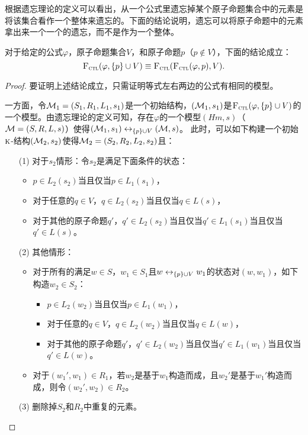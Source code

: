 根据遗忘理论的定义可以看出，从一个公式里遗忘掉某个原子命题集合中的元素是将该集合看作一个整体来遗忘的。下面的结论说明，遗忘可以将原子命题中的元素拿出来一个一个的遗忘，而不是作为一个整体。
\begin{proposition}[Modularity]\label{disTF}
	对于给定的公式$\varphi$，原子命题集合$V$，和原子命题$p$（$p\not \in V$），下面的结论成立：
	\[
	{\textsc{F}_{\textsc{ctl}}}(\varphi,\{p\}\cup V) \equiv {\textsc{F}_{\textsc{ctl}}}({\textsc{F}_{\textsc{ctl}}}(\varphi,p),V).
	\]
\end{proposition}
\begin{proof}
	要证明上述结论成立，只需证明等式左右两边的公式有相同的模型。
	
	一方面，令${\cal M}_1=(S_1,R_1,L_1,s_1)$是一个初始结构，$({\cal M}_1,s_1)$是${\textsc{F}_{\textsc{ctl}}}(\varphi,\{p\}\cup V)$的一个模型。由遗忘理论的定义可知，存在$\varphi$的一个模型$(
	Hm,s)$（${\cal M}=(S,R,L,s)$）使得$({\cal M}_1,s_1)\leftrightarrow_{\{p\}\cup V} ({\cal M},s)$。
	此时，可以如下构建一个初始$\textsc{k}$-结构$({\cal M}_2,s_2)$使得${\cal M}_2=(S_2,R_2,L_2,s_2)$且：
	\begin{itemize}
		\item[(1)] 对于$s_2$情形：令$s_2$是满足下面条件的状态：
		\begin{itemize}
			\item $p \in L_2(s_2)$当且仅当$p\in L_1(s_1)$，
			\item 对于任意的$q \in V$，$q \in L_2(s_2)$当且仅当$q\in L(s)$，
			\item 对于其他的原子命题$q'$，$q' \in L_2(s_2)$当且仅当$q'\in L_1(s_1)$当且仅当$q'\in L(s)$。
		\end{itemize}
			
		\item[(2)] 其他情形：
		\begin{itemize}
			\item 对于所有的满足$w\in S$，$w_1\in S_1$且$w\leftrightarrow_{\{p\}\cup V} w_1$的状态对$(w,w_1)$，如下构造$w_2\in S_2$：
				\begin{itemize}
					\item $p \in L_2(w_2)$当且仅当$p\in L_1(w_1)$，
					\item 对于任意的$q \in V$，$q \in L_2(w_2)$当且仅当$q\in L(w)$，
					\item 对于其他的原子命题$q'$，$q' \in L_2(w_2)$当且仅当$q'\in L_1(w_1)$当且仅当$q'\in L(w)$。
				\end{itemize}
			\item 对于$(w_1',w_1)\in R_1$，若$w_2$是基于$w_1$构造而成，且$w_2'$是基于$w_1'$构造而成，则令$(w_2',w_2)\in R_2$。
		\end{itemize}
		\item[(3)] 删除掉$S_2$和$R_2$中重复的元素。
	\end{itemize}
\end{proof}


